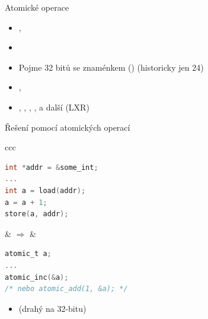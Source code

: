 
\begin{frame}[fragile]{Atomické operace}

  \begin{itemize}
    \item {}, 
    \item {}

    \pause

    \item Pojme 32 bitů se znaménkem () (historicky jen 24)
    \item {}, 

    \pause

    \item {}, , ,
      ,  a další (LXR)
  \end{itemize}

  \pause

  \begin{block}{Řešení pomocí atomických operací}
  \begin{center}
  \begin{tabular}{ccc}
  \begin{lstlisting}[language=C]
int *addr = &some_int;
...
int a = load(addr);
a = a + 1;
store(a, addr);
  \end{lstlisting} & $\Rightarrow$ &
  \begin{lstlisting}[language=C]
atomic_t a;
...
atomic_inc(&a);
/* nebo atomic_add(1, &a); */
  \end{lstlisting}
  \end{tabular}
  \end{center}
  \end{block}

  \pause

  \begin{itemize}
    \item {} (drahý na 32-bitu)
  \end{itemize}

\end{frame}

